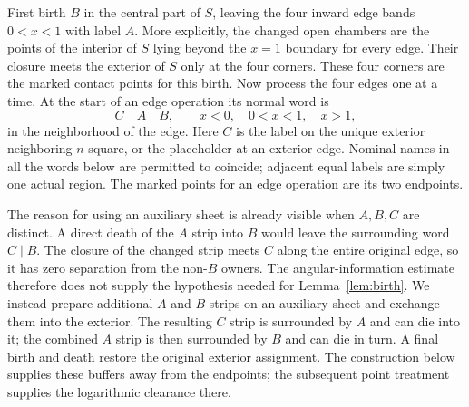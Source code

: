 First birth $B$ in the central part of $S$, leaving the four inward
edge bands $0<x<1$ with label $A$.  More explicitly, the changed open
chambers are the points of the interior of $S$ lying beyond the
$x=1$ boundary for every edge.  Their closure meets the exterior of
$S$ only at the four corners.  These four corners are the marked
contact points for this birth.  Now process the four edges one at a
time.  At the start of an edge operation its normal word is
\[
 C\quad A\quad B,
 \qquad x<0,\quad 0<x<1,\quad x>1,
\]
in the neighborhood of the edge.  Here $C$ is the label on the unique
exterior neighboring $n$-square, or the placeholder at an exterior
edge.  Nominal names in all the words below are permitted to coincide;
adjacent equal labels are simply one actual region.  The marked points
for an edge operation are its two endpoints.

The reason for using an auxiliary sheet is already visible when $A,B,C$
are distinct.  A direct death of the $A$ strip into $B$ would leave the
surrounding word $C\mid B$.  The closure of the changed strip meets $C$
along the entire original edge, so it has zero separation from the
non-$B$ owners.  The angular-information estimate therefore does not
supply the hypothesis needed for Lemma~\ref{lem:birth}.  We instead prepare
additional $A$ and $B$ strips on an auxiliary sheet and exchange them into
the exterior.  The resulting $C$ strip is surrounded by $A$ and can die
into it; the combined $A$ strip is then surrounded by $B$ and can die in
turn.  A final birth and death restore the original exterior assignment.
The construction below supplies these buffers away from the endpoints;
the subsequent point treatment supplies the logarithmic clearance there.

